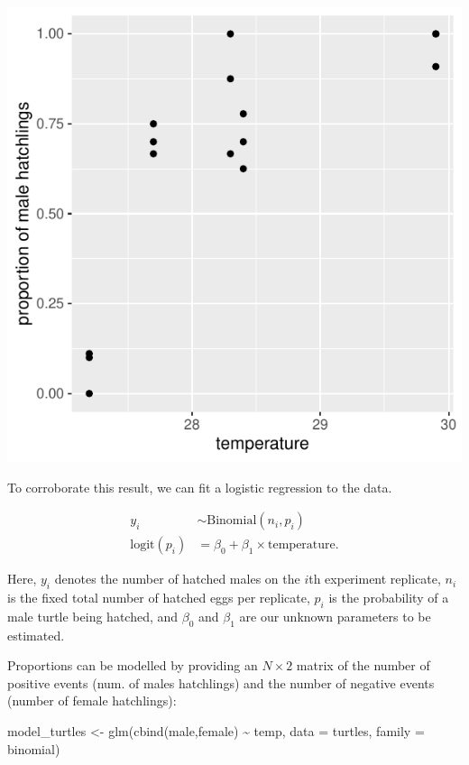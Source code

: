\documentclass[
  letterpaper,
  DIV=11,
  numbers=noendperiod]{scrartcl}
\newenvironment{Shaded}{\begin{snugshade}}{\end{snugshade}}
\newcommand{\AttributeTok}[1]{\textcolor[rgb]{0.40,0.45,0.13}{#1}}
\newcommand{\FunctionTok}[1]{\textcolor[rgb]{0.28,0.35,0.67}{#1}}
\newcommand{\NormalTok}[1]{\textcolor[rgb]{0.00,0.23,0.31}{#1}}
\newcommand{\OtherTok}[1]{\textcolor[rgb]{0.00,0.23,0.31}{#1}}
\newcommand{\SpecialCharTok}[1]{\textcolor[rgb]{0.37,0.37,0.37}{#1}}
\begin{document}
\begin{center}
\includegraphics{index_files/figure-pdf/unnamed-chunk-5-1.pdf}
\end{center}

To corroborate this result, we can fit a logistic regression to the
data.

\begin{align}
y_i &\sim \mathrm{Binomial}(n_i,p_i)\\
\mathrm{logit}(p_i) &= \beta_0 +\beta_1 \times \mathrm{temperature}.
\end{align}

Here, \(y_i\) denotes the number of hatched males on the \(i\)th
experiment replicate, \(n_i\) is the fixed total number of hatched eggs
per replicate, \(p_i\) is the probability of a male turtle being
hatched, and \(\beta_0\) and \(\beta_1\) are our unknown parameters to
be estimated.

Proportions can be modelled by providing an \(N \times 2\) matrix of the
number of positive events (num. of males hatchlings) and the number of
negative events (number of female hatchlings):

\begin{Shaded}
\begin{Highlighting}[]
\NormalTok{model\_turtles }\OtherTok{\textless{}{-}} \FunctionTok{glm}\NormalTok{(}\FunctionTok{cbind}\NormalTok{(male,female) }\SpecialCharTok{\textasciitilde{}}\NormalTok{ temp,}
                     \AttributeTok{data =}\NormalTok{ turtles,}
                     \AttributeTok{family =}\NormalTok{ binomial)}
\end{Highlighting}
\end{Shaded}
\end{document}
